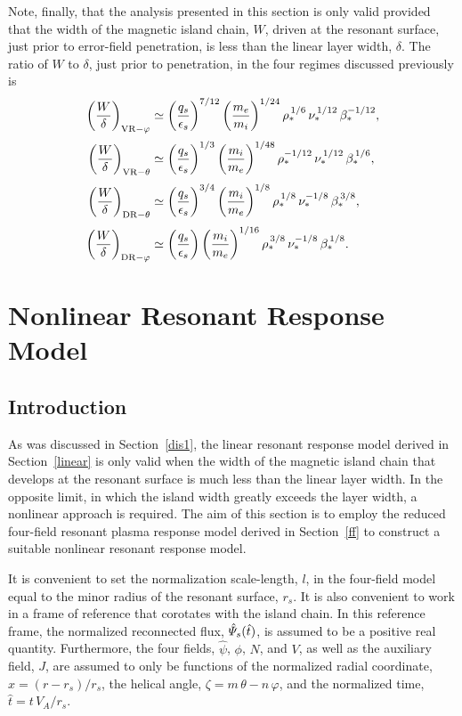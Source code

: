 \documentclass[notitlepage,12pt]{article}
\begin{document}
Note, finally, that the analysis presented in this section is only valid provided that the width of the  magnetic
island chain, $W$,  driven at the resonant surface, just prior to error-field penetration, is less than the linear layer width, $\delta$. 
The ratio of $W$ to $\delta$, just prior to penetration, in the four regimes discussed previously is
\begin{align}
\left(\frac{W}{\delta}\right)_{{\rm VR}-\varphi} &\simeq \left(\frac{q_s}{\epsilon_s}\right)^{7/12}\left(\frac{m_e}{m_i}\right)^{1/24}\rho_\ast^{\,1/6}\,\nu_\ast^{\,1/12}\,\beta_\ast^{-1/12},\\[0.5ex]
\left(\frac{W}{\delta}\right)_{{\rm VR}-\theta} &\simeq \left(\frac{q_s}{\epsilon_s}\right)^{1/3}\left(\frac{m_i}{m_e}\right)^{1/48}\rho_\ast^{-1/12}\,\nu_\ast^{\,1/12}\,\beta_\ast^{\,1/6},\\[0.5ex]
\left(\frac{W}{\delta}\right)_{{\rm DR}-\theta} &\simeq \left(\frac{q_s}{\epsilon_s}\right)^{3/4}\left(\frac{m_i}{m_e}\right)^{1/8}\rho_\ast^{\,1/8}\,\nu_\ast^{-1/8}\,\beta_\ast^{\,3/8},\\[0.5ex]
\left(\frac{W}{\delta}\right)_{{\rm DR}-\varphi} &\simeq \left(\frac{q_s}{\epsilon_s}\right)\left(\frac{m_i}{m_e}\right)^{1/16}\rho_\ast^{\,3/8}\,\nu_\ast^{-1/8}\,\beta_\ast^{\,1/8}.
\end{align}

\section{Nonlinear Resonant Response Model}
\subsection{Introduction}
As was discussed in Section~\ref{dis1}, the linear resonant response model derived in Section~\ref{linear} is only
valid when the width of the magnetic island chain that develops at the resonant surface is much less than the linear layer width. 
In the opposite limit, in which the island width greatly exceeds the layer width, a nonlinear approach is required. 
The aim of this section  is to employ the reduced four-field resonant plasma response model derived in Section~\ref{ff} to 
construct a suitable nonlinear resonant response model. 

It is convenient to set the normalization scale-length, $l$, in the four-field  model equal to the minor radius of the resonant surface, $r_s$. It is also convenient to work in a frame of reference that corotates with the island chain. In this reference frame, the
normalized reconnected flux, $\hat{\mit\Psi}_s(\hat{t})$, is assumed to be a positive real quantity. 
Furthermore, the four fields,
$\hat{\psi}$, $\phi$, $N$, and $V$, as well as the auxiliary field, $J$, are assumed to only be functions of  the normalized radial coordinate, $\hat{x} = (r-r_s)/r_s$, the
helical angle, $\zeta= m\,\theta-n\,\varphi$, and the
normalized time, $\hat{t}= t\,V_A/r_s$. 
\end{document}
